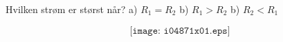 

Hvilken strøm er størst når?
\vskip 10pt
a) $R_1=R_2$
\vskip 10pt
b) $R_1>R_2$
\vskip 10pt
b) $R_2<R_1$
\vskip 10pt

$$\texttt{[image: i04871x01.eps]}$$




















